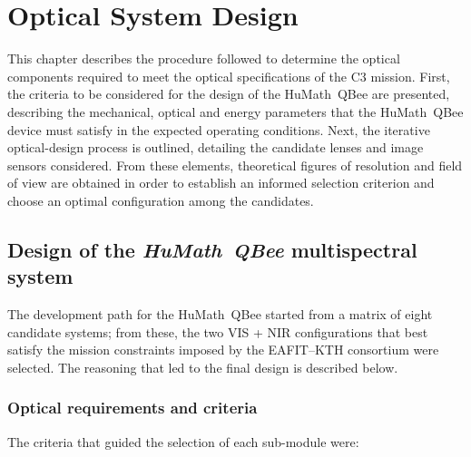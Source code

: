 
\chapter{Optical System Design}         %

This chapter describes the procedure followed to determine the optical
components required to meet the optical specifications of the C3
mission.  First, the criteria to be considered for the design of the
HuMath\textregistered\ QBee are presented, describing the mechanical,
optical and energy parameters that the HuMath\textregistered\ QBee
device must satisfy in the expected operating conditions.  Next, the
iterative optical-design process is outlined, detailing the candidate
lenses and image sensors considered.  From these elements, theoretical
figures of resolution and field of view are obtained in order to
establish an informed selection criterion and choose an optimal
configuration among the candidates.

\section{Design of the \textit{HuMath\textregistered\ QBee} multispectral system}

The development path for the HuMath\textregistered\ QBee started from a
matrix of eight candidate systems; from these, the two VIS + NIR
configurations that best satisfy the mission constraints imposed by the
EAFIT–KTH consortium were selected.  The reasoning that led to the final
design is described below.

\subsection{Optical requirements and criteria}

The criteria that guided the selection of each sub-module were:

